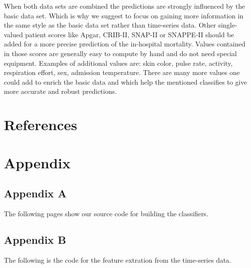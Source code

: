\documentclass[a4paper,11pt]{article}
\begin{document}
When both data sets are combined the predictions are strongly influenced by the basic data set. Which is why we suggest to focus on gaining more information in the same style as the basic data set rather than time-series data. Other single-valued patient scores like Apgar, CRIB-II, SNAP-II or SNAPPE-II should be added for a more precise prediction of the in-hospital mortality. Values contained in those scores are generally easy to compute by hand and do not need special equipment. Examples of additional values are: skin color, pulse rate, activity, respiration effort, sex, admission temperature. There are many more values one could add to enrich the basic data and which help the mentioned classifies to give more accurate and robust predictions. 

\section{References}



\section{Appendix}
\subsection*{Appendix A}
The following pages show our source code for building the classifiers. 

\subsection*{Appendix B}
The following is the code for the feature extration from the time-series data.

\end{document}
